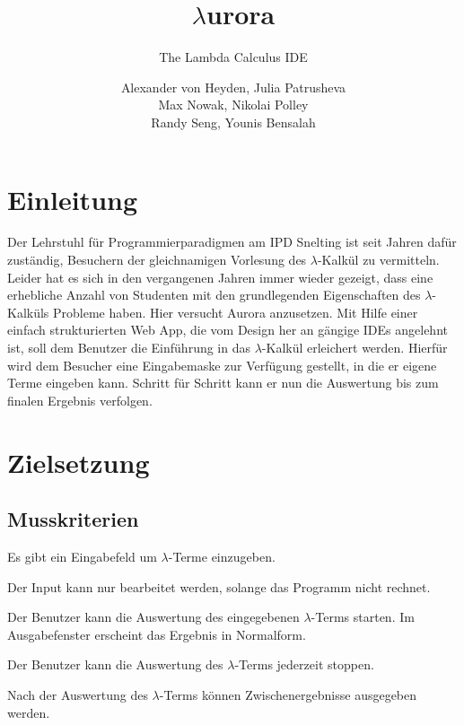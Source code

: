 \documentclass[parskip=full,11pt,twoside]{scrartcl}
\title{\textbf{$\lambda$}urora}
\subtitle{The Lambda Calculus IDE}
\author{Alexander von Heyden, Julia Patrusheva\\
 Max Nowak, Nikolai Polley\\
 Randy Seng, Younis Bensalah}
\begin{document}
\maketitle
\newpage
\tableofcontents

\newpage
\section{Einleitung}
Der Lehrstuhl für Programmierparadigmen am IPD Snelting ist seit Jahren dafür zuständig, Besuchern der gleichnamigen Vorlesung des $\lambda$-Kalkül zu vermitteln. Leider hat es sich in den vergangenen Jahren immer wieder gezeigt, dass eine erhebliche Anzahl von Studenten mit den grundlegenden Eigenschaften des $\lambda$-Kalküls Probleme haben. Hier versucht Aurora anzusetzen. Mit Hilfe einer einfach strukturierten Web App, die vom Design her an gängige IDEs angelehnt ist, soll dem Benutzer die Einführung in das $\lambda$-Kalkül erleichert werden. Hierfür wird dem Besucher eine Eingabemaske zur Verfügung gestellt, in die er eigene Terme eingeben kann. Schritt für Schritt kann er nun die Auswertung bis zum finalen Ergebnis verfolgen.


\newpage
\section{Zielsetzung}


\subsection{Musskriterien}

Es gibt ein Eingabefeld um $\lambda$-Terme einzugeben.

Der Input kann nur bearbeitet werden, solange das Programm nicht rechnet.

Der Benutzer kann die Auswertung des eingegebenen $\lambda$-Terms starten. Im Ausgabefenster erscheint das Ergebnis in Normalform. 

Der Benutzer kann die Auswertung des $\lambda$-Terms jederzeit stoppen.

Nach der Auswertung des $\lambda$-Terms können Zwischenergebnisse ausgegeben werden.
\end{document}

